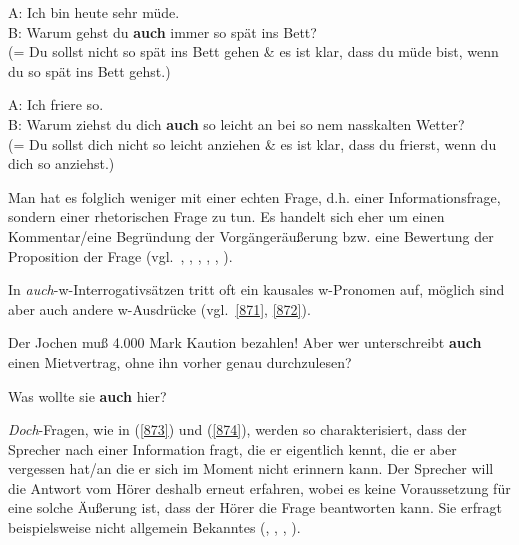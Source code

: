 {\begin{exe}
	\ex\label{8690}
	A: Ich bin heute sehr müde.\\
	B: Warum gehst du \textbf{auch} immer so spät ins Bett?		
	\hfill\hbox{\citet[89]{Helbig1990}}\\
	(= Du sollst nicht so spät ins Bett gehen \& es ist klar, dass du müde bist, wenn du so spät ins Bett gehst.)		
\end{exe}	

\begin{exe}
	\ex\label{870}
	A: Ich friere so.\\
	B: Warum ziehst du dich \textbf{auch} so leicht an bei so nem nasskalten Wetter?
	\newline	
	\hbox{}\hfill\hbox{\citet[218]{Franck1980}}\\
	(= Du sollst dich nicht so leicht anziehen \& es ist klar, dass du frierst, wenn du dich so anziehst.)		
\end{exe}	
Man hat es folglich weniger mit einer echten Frage, d.h. einer  Informationsfrage, sondern einer rhetorischen Frage  zu tun. Es handelt sich eher um einen Kommentar/eine Begründung der Vorgängeräußerung bzw. eine Bewertung der Proposition der Frage (vgl.\ \citealt[218--219]{Franck1980}, \citealt[51--54]{Dahl1988}, \citealt[158--159]{Thurmair1989}, \citealt[89]{Helbig1990}, \citealt[231]{Karagjosova2004}, \citealt[77, 202]{Kwon2005}).

In \textit{auch}-w-Interrogativsätzen tritt oft ein kausales w-Pronomen auf, möglich sind aber auch andere w-Ausdrücke (vgl.\ \ref{871}, \ref{872}).

\begin{exe}
	\ex\label{871}
	Der Jochen muß 4.000 Mark Kaution bezahlen! Aber wer unterschreibt \textbf{auch} einen Mietvertrag, ohne ihn vorher genau durchzulesen?	
	\newline
	\hbox{}\hfill\hbox{\citet[159]{Thurmair1989}}
\end{exe}
	
\begin{exe}
	\ex\label{872}
	Was wollte sie \textbf{auch} hier?
	\hfill\hbox{\citet[51]{Dahl1988}}	
\end{exe}
\textit{Doch}-Fragen, wie in (\ref{873}) und (\ref{874}), werden so charakterisiert, dass der Sprecher nach einer Information fragt, die er eigentlich kennt, die er aber vergessen hat/an die er sich im Moment nicht erinnern kann. Der Sprecher will die Antwort vom Hörer deshalb erneut erfahren, wobei es keine Voraussetzung für eine solche Äußerung ist, dass der Hörer die Frage beantworten kann. Sie erfragt beispiels\-weise nicht allgemein Bekanntes (\citealt[88]{Dahl1988}, \citealt[117]{Thurmair1989}, \citealt[114]{Helbig1990}, \citealt[204]{Kwon2005}).

}
